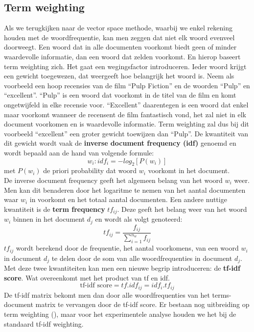 \subsection{Term weighting}\label{Term weighting}

Als we terugkijken naar de vector space methode, waarbij we enkel rekening houden met de woordfrequentie, kan men zeggen dat niet elk woord evenveel doorweegt. Een woord dat in alle documenten voorkomt biedt geen of minder waardevolle informatie, dan een woord dat zelden voorkomt. En hierop baseert term weighting zich. Het gaat een wegingsfactor introduceren. Ieder woord krijgt een gewicht toegewezen, dat weergeeft hoe belangrijk het woord is. Neem als voorbeeld een hoop recensies van de film ``Pulp Fiction'' en de woorden ``Pulp'' en ``excellent''. ``Pulp'' is een woord dat voorkomt in de titel van de film en komt ongetwijfeld in elke recensie voor. ``Excellent'' daarentegen is een woord dat enkel maar voorkomt wanneer de recensent de film fantastisch vond, het zal niet in elk document voorkomen en is waardevolle informatie. Term weighting zal dus bij dit voorbeeld ``excellent'' een groter gewicht toewijzen dan ``Pulp''. 
%
De kwantiteit van dit gewicht wordt vaak de \textbf{inverse document frequency  (idf)} genoemd en wordt bepaald aan de hand van volgende formule:
\[w_{i}: idf_{i} = -log_{2}[P(w_{i})] \]
met $P(w_{i})$ de priori probability dat woord $w_{i}$ voorkomt in het document.\\
%
De inverse document frequency geeft het algemeen belang van het woord $w_{i}$ weer. Men kan dit benaderen door het logaritme te nemen van het aantal documenten waar $w_{i}$ in voorkomt en het totaal aantal documenten.
Een andere nuttige kwantiteit is de  \textbf{term frequency} $tf_{ij}$. Deze geeft het belang weer van het woord $w_{i}$ binnen in het document $d_{j}$  en wordt als volgt genoteerd:
\[ tf_{ij} = \frac{f_{ij}}{ \sum_{i=1}^{n_{w}}f_{ij}} \]
%
$tf_{ij}$ wordt berekend door de frequentie, het aantal voorkomens, van een woord $w_{i}$ in document $d_{j}$ te delen door de som van alle woordfrequenties in document $d_{j}$.
Met deze twee kwantiteiten kan men een nieuwe begrip introduceren: de \textbf{tf-idf score}. Wat overeenkomt met het product van tf en idf.
\[ \text{tf-idf score} = tf . idf_{ij} = idf_{i} . tf_{ij} \]
%
De tf-idf matrix bekomt men dan door alle woordfrequenties van het terms-document matrix te vervangen door de tf-idf score.
Er bestaan nog uitbreiding op term weighting (\cite{altoglou2010study}), maar voor het experimentele analyse houden we het bij de standaard tf-idf weighting.

